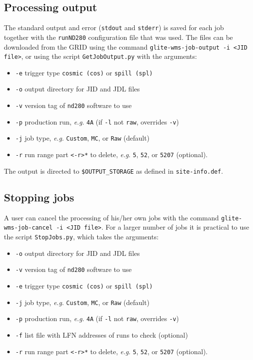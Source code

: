 \documentclass[11pt]{article}
\begin{document}
\subsection{Processing output}
The standard output and error (\verb+stdout+ and \verb+stderr+) is
saved for each job together with the \verb+runND280+ configuration
file that was used. The files can be downloaded from the GRID using
the command \verb+glite-wms-job-output -i <JID file>+, or using the
script \verb+GetJobOutput.py+ with the arguments:
\begin{itemize}
\item \verb+-e+ trigger type \verb+cosmic (cos)+ or \verb+spill (spl)+
\item \verb+-o+ output directory for JID and JDL files
\item \verb+-v+ version tag of \verb+nd280+ software to use
\item \verb+-p+ production run, \textit{e.g.} \verb+4A+ (if \verb+-l+ not \verb+raw+, overrides \verb+-v+)
\item \verb+-j+ job type, \textit{e.g.} \verb+Custom+, \verb+MC+, or \verb+Raw+ (default)
\item \verb+-r+ run range part \verb+<-r>*+ to delete, \textit{e.g.} \verb+5+, \verb+52+, or \verb+5207+ (optional).
\end{itemize}

The output is directed to \verb+$OUTPUT_STORAGE+ as defined in \verb+site-info.def+.

\subsection{Stopping jobs}
A user can cancel the processing of his/her own jobs with the command
\verb+glite-wms-job-cancel -i <JID file>+. For a larger number of jobs
it is practical to use the script \verb+StopJobs.py+, which takes the
arguments:
\begin{itemize}
\item \verb+-o+ output directory for JID and JDL files
\item \verb+-v+ version tag of \verb+nd280+ software to use
\item \verb+-e+ trigger type \verb+cosmic (cos)+ or \verb+spill (spl)+
\item \verb+-j+ job type, \textit{e.g.} \verb+Custom+, \verb+MC+, or \verb+Raw+ (default)
\item \verb+-p+ production run, \textit{e.g.} \verb+4A+ (if \verb+-l+ not \verb+raw+, overrides \verb+-v+)
\item \verb+-f+ list file with LFN addresses of runs to check (optional)
\item \verb+-r+ run range part \verb+<-r>*+ to delete, \textit{e.g.} \verb+5+, \verb+52+, or \verb+5207+ (optional).
\end{itemize}
\end{document}
